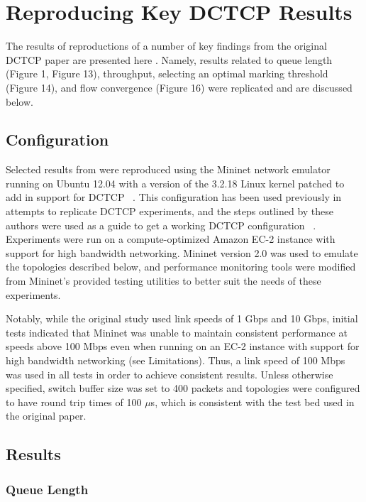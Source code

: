 \section{Reproducing Key DCTCP Results}

The results of reproductions of a number of key findings from the original DCTCP paper are presented here \cite{alizadeh_data_2010}. Namely, results related to queue length (Figure 1, Figure 13), throughput, selecting an optimal marking threshold (Figure 14), and flow convergence (Figure 16) were replicated and are discussed below.  

\subsection{Configuration}

Selected results from \cite{alizadeh_data_2010} were reproduced using the Mininet network emulator running on Ubuntu 12.04 with a version of the 3.2.18 Linux kernel patched to add in support for DCTCP ~\cite{mininet_team_mininet:_2014}. This configuration has been used previously in attempts to replicate DCTCP experiments, and the steps outlined by these authors were used as a guide to get a working DCTCP configuration ~\cite{raghaven_cs244_2013}. Experiments were run on a compute-optimized Amazon EC-2 instance with support for high bandwidth networking. Mininet version 2.0 was used to emulate the topologies described below, and performance monitoring tools were modified from Mininet's provided testing utilities to better suit the needs of these experiments.

Notably, while the original study used link speeds of 1 Gbps and 10 Gbps, initial tests indicated that Mininet was unable to maintain consistent performance at speeds above 100 Mbps even when running on an EC-2 instance with support for high bandwidth networking (see Limitations). Thus, a link speed of 100 Mbps was used in all tests in order to achieve consistent results. Unless otherwise specified, switch buffer size was set to 400 packets and topologies were configured to have round trip times of 100 $\mu$s, which is consistent with the test bed used in the original paper.

\subsection{Results}

\subsubsection{Queue Length}

